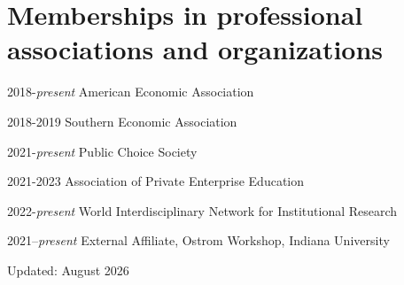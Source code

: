 \documentclass[12pt,letterpaper]{report}
\newcommand{\listitemspace}{0.15em} %
\renewenvironment{itemize}
{\begin{list}{}{\setlength{\leftmargin}{0em}
            \setlength{\parskip}{0em}
            \setlength{\itemsep}{\listitemspace}
            \setlength{\parsep}{\listitemspace}}}
{\end{list}}
\begin{document}



    \section*{Memberships in professional associations and organizations}

    \begin{tablist}
		\item [2018-\textit{present}] \tab American Economic Association
		\item [2018-2019] \tab Southern Economic Association
		\item [2021-\textit{present}] \tab Public Choice Society
		\item [2021-2023] \tab Association of Private Enterprise Education
		\item [2022-\textit{present}] \tab World Interdisciplinary Network for Institutional Research
           \item [2021--\textit{present}]  \tab External Affiliate, Ostrom Workshop, Indiana University
    \end{tablist}



    \begin{center}
        \vfill
        Updated: August 2026
    \end{center}
\end{document}
